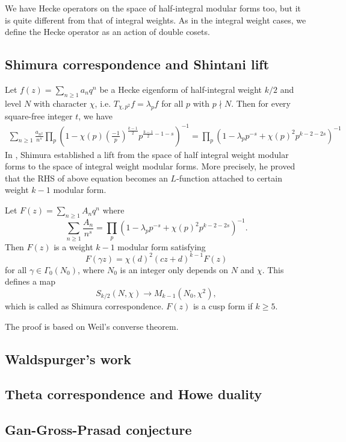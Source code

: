 We have Hecke operators on the space of half-integral modular forms too, but it is quite different from that of integral weights.
As in the integral weight cases, we define the Hecke operator as an action of double cosets.



\subsection{Shimura correspondence and Shintani lift}
Let $f(z) = \sum_{n \geq 1} a_{n}q^{n}$ be a Hecke eigenform of half-integral weight $k/2$ and level $N$ with character $\chi$, i.e.
$T_{\chi, p^{2}}f = \lambda_{p}f$ for all $p$ with $p\nmid N$.
Then for every square-free integer $t$, we have
\begin{align*}
    \sum_{n\geq 1} \frac{a_{n^{2}}}{n^{s}} \prod_{p} \left(1 - \chi(p)\left(\frac{-1}{p}\right)^{\frac{k-1}{2}}p^{\frac{k-1}{2}-1-s}\right)^{-1} = \prod_{p} (1 - \lambda_{p} p^{-s} + \chi(p)^{2}p^{k-2-2s})^{-1}
\end{align*}
In \cite{shimura1973onmodular}, Shimura established a lift from the space of 
half integral weight modular forms to the space of integral weight modular forms.
More precisely, he proved that the RHS of above equation becomes an $L$-function attached to
certain weight $k-1$ modular form.
\begin{theorem}
Let $F(z) = \sum_{n\geq 1} A_{n}q^{n}$ where
$$
\sum_{n\geq 1} \frac{A_{n}}{n^{s}} = \prod_{p} (1 - \lambda_{p} p^{-s} + \chi(p)^{2}p^{k-2-2s})^{-1}.
$$
Then $F(z)$ is a weight $k-1$ modular form satisfying
$$
F(\gamma z) = \chi(d)^{2}(cz + d)^{k-1} F(z)
$$
for all $\gamma \in \Gamma_{0}(N_{0})$, where $N_{0}$ is an integer only depends on $N$ and $\chi$.
This defines a map
$$S_{k/2}(N, \chi) \to M_{k-1}(N_{0}, \chi^{2}),$$
which is called as Shimura correspondence.
$F(z)$ is a cusp form if $k\geq 5$.
\end{theorem}
The proof is based on Weil's converse theorem.

\subsection{Waldspurger's work}

\subsection{Theta correspondence and Howe duality}

\subsection{Gan-Gross-Prasad conjecture}